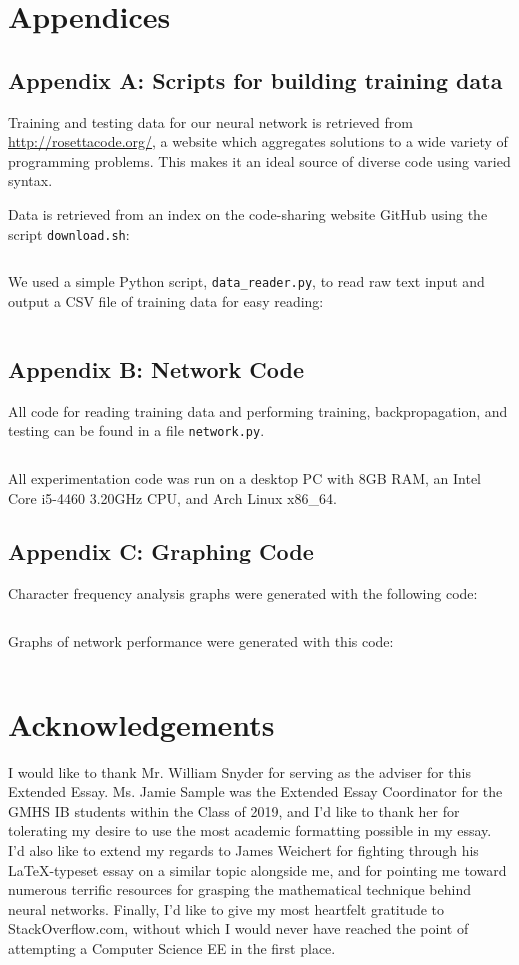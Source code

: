 \documentclass{article}
\begin{document}
\newpage

\section{Appendices}

\label{sec:appendix_a}
\subsection{Appendix A: Scripts for building training data}
Training and testing data for our neural network is retrieved from \url{http://rosettacode.org/}, a website which aggregates solutions to a wide variety of programming problems. This makes it an ideal source of diverse code using varied syntax.

Data is retrieved from an index on the code-sharing website GitHub\cite{rosettacodegh} using the script \texttt{download.sh}:
\inputminted{bash}{code/data/download.sh}

We used a simple Python script, \texttt{data\_reader.py}, to read raw text input and output a CSV file of training data for easy reading:
\inputminted{cpp}{"code/data_reader.py"}

\label{sec:appendix_b}
\subsection{Appendix B: Network Code}
All code for reading training data and performing training, backpropagation, and testing can be found in a file \texttt{network.py}.
\inputminted{python}{code/network.py}

All experimentation code was run on a desktop PC with 8GB RAM, an Intel Core i5-4460 3.20GHz CPU, and Arch Linux x86\_64.

\label{sec:appendix_c}
\subsection{Appendix C: Graphing Code}
Character frequency analysis graphs were generated with the following code:
\inputminted{python}{"code/data_graphs.py"}
Graphs of network performance were generated with this code:
\inputminted{python}{code/graphs.py}


\section{Acknowledgements}
I would like to thank Mr. William Snyder for serving as the adviser for this Extended Essay. Ms. Jamie Sample was the Extended Essay Coordinator for the GMHS IB students within the Class of 2019, and I'd like to thank her for tolerating my desire to use the most academic formatting possible in my essay. I'd also like to extend my regards to James Weichert for fighting through his \LaTeX-typeset essay on a similar topic alongside me, and for pointing me toward numerous terrific resources for grasping the mathematical technique behind neural networks. Finally, I'd like to give my most heartfelt gratitude to StackOverflow.com, without which I would never have reached the point of attempting a Computer Science EE in the first place.


\end{document}
